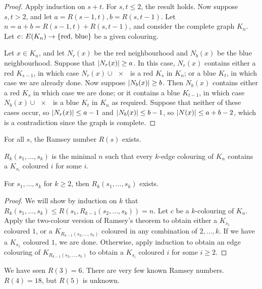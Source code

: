 \begin{proof}
	Apply induction on \( s + t \).
	For \( s, t \leq 2 \), the result holds.
	Now suppose \( s, t > 2 \), and let \( a = R(s-1,t), b = R(s,t-1) \).
	Let \( n = a + b = R(s-1,t) + R(s,t-1) \), and consider the complete graph \( K_n \).
	Let \( c \colon E(K_n) \to \qty{\text{red, blue}} \) be a given colouring.

	Let \( x \in K_n \), and let \( N_r(x) \) be the red neighbourhood and \( N_b(x) \) be the blue neighbourhood.
	Suppose that \( \abs{N_r(x)} \geq a \).
	In this case, \( N_r(x) \) contains either a red \( K_{s-1} \), in which case \( N_r(x) \cup \qty{x} \) is a red \( K_s \) in \( K_n \); or a blue \( K_t \), in which case we are already done.
	Now suppose \( \abs{N_b(x)} \geq b \).
	Then \( N_b(x) \) contains either a red \( K_s \) in which case we are done; or it contains a blue \( K_{t-1} \), in which case \( N_b(x) \cup \qty{x} \) is a blue \( K_t \) in \( K_n \) as required.
	Suppose that neither of these cases occur, so \( \abs{N_r(x)} \leq a - 1 \) and \( \abs{N_b(x)} \leq b - 1 \), so \( \abs{N(x)} \leq a + b - 2 \), which is a contradiction since the graph is complete.
\end{proof}
\begin{corollary}
	For all \( s \), the Ramsey number \( R(s) \) exists.
\end{corollary}
\begin{definition}
	\( R_k(s_1, \dots, s_k) \) is the minimal \( n \) such that every \( k \)-edge colouring of \( K_n \) contains a \( K_{s_i} \) coloured \( i \) for some \( i \).
\end{definition}
\begin{theorem}
	For \( s_1, \dots, s_k \) for \( k \geq 2 \), then \( R_k(s_1, \dots, s_k) \) exists.
\end{theorem}
\begin{proof}
	We will show by induction on \( k \) that \( R_k(s_1, \dots, s_k) \leq R(s_1, R_{k-1}(s_2, \dots, s_k)) = n \).
	Let \( c \) be a \( k \)-colouring of \( K_n \).
	Apply the two-colour version of Ramsey's theorem to obtain either a \( K_{s_1} \) coloured \( 1 \), or a \( K_{R_{k-1}(s_2, \dots, s_k)} \) coloured in any combination of \( 2, \dots, k \).
	If we have a \( K_{s_1} \) coloured \( 1 \), we are done.
	Otherwise, apply induction to obtain an edge colouring of \( K_{R_{k-1}(s_2, \dots, s_k)} \) to obtain a \( K_{s_i} \) coloured \( i \) for some \( i \geq 2 \).
\end{proof}
\begin{remark}
	We have seen \( R(3) = 6 \).
	There are very few known Ramsey numbers.
	\( R(4) = 18 \), but \( R(5) \) is unknown.
\end{remark}

